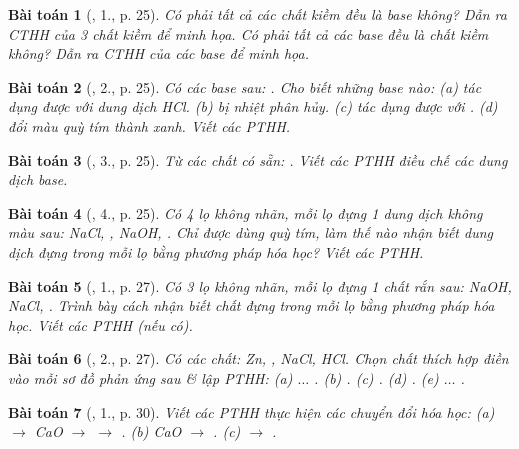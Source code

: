 \documentclass{article}
\newtheorem{baitoan}{Bài toán}
\begin{document}
\begin{baitoan}[\cite{SGK_Hoa_Hoc_9}, 1., p. 25]
	Có phải tất cả các chất kiềm đều là base không? Dẫn ra CTHH của 3 chất kiềm để minh họa. Có phải tất cả các base đều là chất kiềm không? Dẫn ra CTHH của các base để minh họa.
\end{baitoan}

\begin{baitoan}[\cite{SGK_Hoa_Hoc_9}, 2., p. 25]
	Có các base sau: \emph{}. Cho biết những base nào: (a) tác dụng được với dung dịch \emph{HCl}. (b) bị nhiệt phân hủy. (c) tác dụng được với \emph{}. (d) đổi màu quỳ tím thành xanh. Viết các PTHH.
\end{baitoan}

\begin{baitoan}[\cite{SGK_Hoa_Hoc_9}, 3., p. 25]
	Từ các chất có sẵn: \emph{}. Viết các PTHH điều chế các dung dịch base.
\end{baitoan}

\begin{baitoan}[\cite{SGK_Hoa_Hoc_9}, 4., p. 25]
	Có 4 lọ không nhãn, mỗi lọ đựng 1 dung dịch không màu sau: \emph{NaCl, , NaOH, }. Chỉ được dùng quỳ tím, làm thế nào nhận biết dung dịch đựng trong mỗi lọ bằng phương pháp hóa học? Viết các PTHH.
\end{baitoan}

\begin{baitoan}[\cite{SGK_Hoa_Hoc_9}, 1., p. 27]
	Có 3 lọ không nhãn, mỗi lọ đựng 1 chất rắn sau: \emph{NaOH, NaCl, }. Trình bày cách nhận biết chất đựng trong mỗi lọ bằng phương pháp hóa học. Viết các PTHH (nếu có).
\end{baitoan}

\begin{baitoan}[\cite{SGK_Hoa_Hoc_9}, 2., p. 27]
	Có các chất: \emph{Zn, , NaCl, HCl}. Chọn chất thích hợp điền vào mỗi sơ đồ phản ứng sau \& lập PTHH: (a) \emph{$\ldots$ }. (b) \emph{}. (c) \emph{}. (d) \emph{}. (e) \emph{$\ldots$ }.
\end{baitoan}

\begin{baitoan}[\cite{SGK_Hoa_Hoc_9}, 1., p. 30]
	Viết các PTHH thực hiện các chuyển đổi hóa học: (a) \emph{ $\to$ CaO $\to$  $\to$ }. (b) \emph{CaO $\to$ }. (c) \emph{ $\to$ }.
\end{baitoan}
\end{document}
